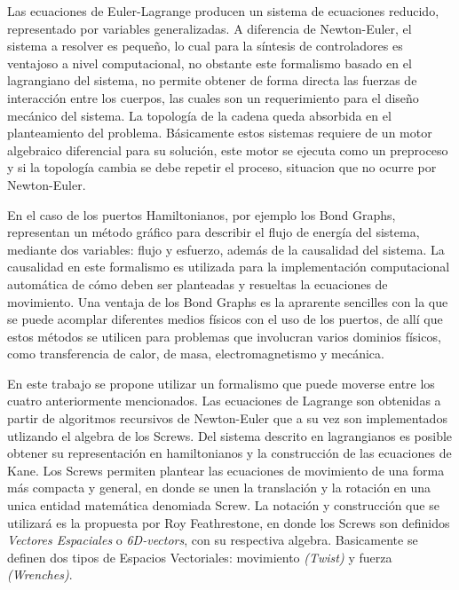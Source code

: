 \documentclass[journal,letterpaper,twoside,twocolumn]{IEEEtran}
\begin{document}
Las ecuaciones de Euler-Lagrange producen un sistema de ecuaciones reducido, representado por variables generalizadas\cite{Spong2006}. A diferencia de Newton-Euler, el sistema a resolver es pequeño, lo cual para la síntesis de controladores es ventajoso a nivel computacional, no obstante este formalismo basado en el lagrangiano del sistema, no permite obtener de forma directa las fuerzas de interacción entre los cuerpos, las cuales son un requerimiento para el diseño mecánico del sistema. La topología de la cadena queda absorbida en el planteamiento del problema\cite{Featherstone2005}. Básicamente estos sistemas requiere de un motor algebraico diferencial para su solución, este motor se ejecuta como un preproceso y si la topología cambia se debe repetir el proceso\cite{Docquier2013}, situacion que no ocurre por Newton-Euler.

En el caso de los puertos Hamiltonianos, por ejemplo los Bond Graphs, representan un método gráfico para describir el flujo de energía del sistema, mediante dos variables: flujo y esfuerzo, además de la causalidad del sistema\cite{VanderSchaft2014}. La causalidad en este formalismo es utilizada para la implementación computacional automática de cómo deben ser planteadas y resueltas la ecuaciones de movimiento\cite{damic2015,Nageshrao2015b}. Una ventaja de los Bond Graphs es la aprarente sencilles con la que se puede acomplar diferentes medios físicos con el uso de los puertos, de allí que estos métodos se utilicen para problemas que involucran varios dominios físicos, como transferencia de calor, de masa, electromagnetismo y mecánica\cite{Nageshrao2015b}.

En este trabajo se propone utilizar un formalismo que puede moverse entre los cuatro anteriormente mencionados. Las ecuaciones de Lagrange son obtenidas a partir de algoritmos recursivos de Newton-Euler que a su vez son implementados utlizando el algebra de los Screws. Del sistema descrito en lagrangianos es posible obtener su representación en hamiltonianos y la construcción de las ecuaciones de Kane\cite{Liu2005a}. Los Screws permiten plantear las ecuaciones de movimiento de una forma más compacta y general, en donde se unen la translación y la rotación en una unica entidad matemática denomiada Screw\cite{Stramigioli2001}. La notación y construcción que se utilizará es la propuesta por Roy Feathrestone, en donde los Screws son definidos \emph{Vectores Espaciales} o \emph{6D-vectors}, con su respectiva algebra\cite{Featherstone2008,Featherstone2010b,Featherstone2010a}. Basicamente se definen dos tipos de Espacios Vectoriales: movimiento \emph{(Twist)} y fuerza \emph{(Wrenches)}\cite{Featherstone2006}.
\end{document}
